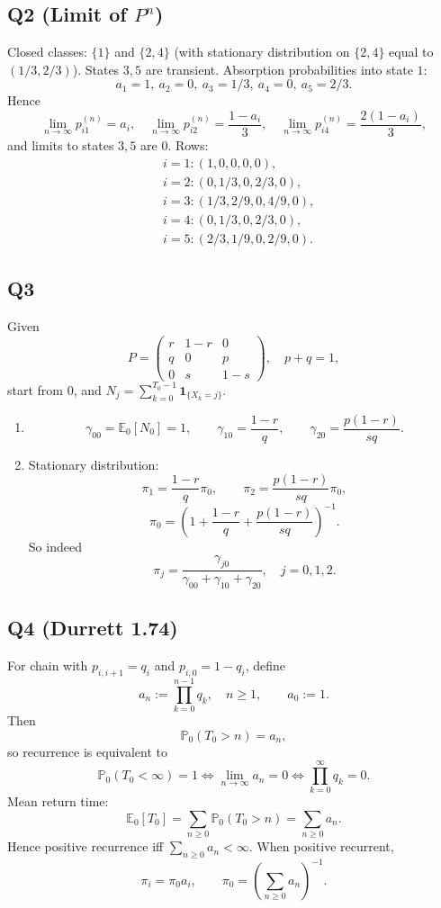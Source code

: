 \documentclass[11pt]{article}
\newcommand{\PP}{\mathbb{P}}
\newcommand{\EE}{\mathbb{E}}
\newcommand{\1}{\mathbf{1}}
\begin{document}
\subsection*{Q2 (Limit of $P^n$)}
Closed classes: $\{1\}$ and $\{2,4\}$ (with stationary distribution on $\{2,4\}$ equal to $(1/3,2/3)$). States $3,5$ are transient.
Absorption probabilities into state $1$:
\[
a_1=1,\ a_2=0,\ a_3=1/3,\ a_4=0,\ a_5=2/3.
\]
Hence
\[
\lim_{n\to\infty}p^{(n)}_{i1}=a_i,\quad
\lim_{n\to\infty}p^{(n)}_{i2}=\frac{1-a_i}{3},\quad
\lim_{n\to\infty}p^{(n)}_{i4}=\frac{2(1-a_i)}{3},
\]
and limits to states $3,5$ are $0$. Rows:
\[
\begin{aligned}
& i=1:(1,0,0,0,0),\\
& i=2:(0,1/3,0,2/3,0),\\
& i=3:(1/3,2/9,0,4/9,0),\\
& i=4:(0,1/3,0,2/3,0),\\
& i=5:(2/3,1/9,0,2/9,0).
\end{aligned}
\]

\subsection*{Q3}
Given
\[
P=\begin{pmatrix}
r&1-r&0\\
q&0&p\\
0&s&1-s
\end{pmatrix},\quad p+q=1,
\]
start from $0$, and $N_j=\sum_{k=0}^{T_0-1}\1_{\{X_k=j\}}$.
\begin{enumerate}[label=(\alph*)]
\item
\[
\gamma_{00}=\EE_0[N_0]=1,
\qquad
\gamma_{10}=\frac{1-r}{q},
\qquad
\gamma_{20}=\frac{p(1-r)}{sq}.
\]
\item Stationary distribution:
\[
\pi_1=\frac{1-r}{q}\pi_0,\qquad \pi_2=\frac{p(1-r)}{sq}\pi_0,
\]
\[
\pi_0=\left(1+\frac{1-r}{q}+\frac{p(1-r)}{sq}\right)^{-1}.
\]
So indeed
\[
\pi_j=\frac{\gamma_{j0}}{\gamma_{00}+\gamma_{10}+\gamma_{20}},\quad j=0,1,2.
\]
\end{enumerate}

\subsection*{Q4 (Durrett 1.74)}
For chain with $p_{i,i+1}=q_i$ and $p_{i,0}=1-q_i$, define
\[
a_n:=\prod_{k=0}^{n-1}q_k,\quad n\ge1,\qquad a_0:=1.
\]
Then
\[
\PP_0(T_0>n)=a_n,
\]
so recurrence is equivalent to
\[
\PP_0(T_0<\infty)=1\iff \lim_{n\to\infty}a_n=0\iff \prod_{k=0}^\infty q_k=0.
\]
Mean return time:
\[
\EE_0[T_0]=\sum_{n\ge0}\PP_0(T_0>n)=\sum_{n\ge0}a_n.
\]
Hence positive recurrence iff $\sum_{n\ge0}a_n<\infty$.
When positive recurrent,
\[
\pi_i=\pi_0 a_i,\qquad
\pi_0=\left(\sum_{n\ge0}a_n\right)^{-1}.
\]
\end{document}
